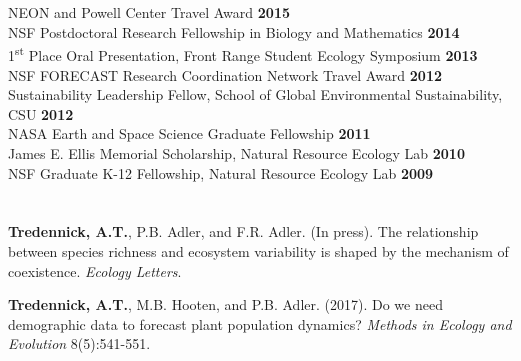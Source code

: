 \documentclass[margin,line]{resume}
\begin{document}
\begin{resume}
     \section{\textmd{\textsf{\color{MidnightBlue}{Fellowships \\and Awards}}}}
        		NEON and Powell Center Travel Award \hfill \textbf{2015}\vspace{.5mm}\\%
                NSF Postdoctoral Research Fellowship in Biology and Mathematics    \hfill \textbf{2014}\vspace{.5mm}\\%
                1\textsuperscript{st} Place Oral Presentation, Front Range Student Ecology Symposium  \hfill \textbf{2013}\vspace{.5mm}\\%
                NSF FORECAST Research Coordination Network Travel Award \hfill \textbf{2012}\vspace{.5mm}\\%
                Sustainability Leadership Fellow, School of Global Environmental Sustainability, CSU \hfill \textbf{2012}\vspace{.5mm}\\%
		NASA Earth and Space Science Graduate Fellowship  \hfill \textbf{2011}\vspace{.5mm}\\%
		James E. Ellis Memorial Scholarship, Natural Resource Ecology Lab  \hfill \textbf{2010}\vspace{.5mm}\\%
		NSF Graduate K-12 Fellowship, Natural Resource Ecology Lab                        \hfill\textbf{2009}%
   
      \section{\textmd{\textsf{\color{MidnightBlue}{Publications}}}}
      \textbf{Tredennick, A.T.}, P.B. Adler, and F.R. Adler. (In press). The relationship between species richness and ecosystem variability is shaped by the mechanism of coexistence. \emph{Ecology Letters}. 
      
      \textbf{Tredennick, A.T.}, M.B. Hooten,  and P.B. Adler. (2017). Do we need demographic data to forecast plant population dynamics? \emph{Methods in Ecology and Evolution} 8(5):541-551.


\end{resume}
\end{document}
